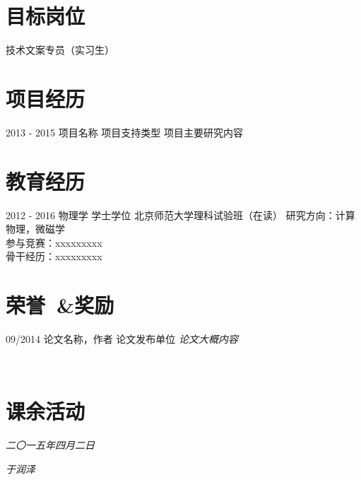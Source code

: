 \documentclass[]{friggeri-cv}
\begin{document}
\section{\cuti 目标岗位}
技术文案专员（实习生）
\section{\cuti 项目经历}
\begin{entrylist}
  \entry
    {2013 - 2015}
    {\cuti 项目名称}
    {项目支持类型}
    {项目主要研究内容\\}
\end{entrylist}

\section{\cuti 教育经历}
\begin{entrylist}
  \entry
    {2012 - 2016}
    {\cuti 物理学 学士学位}
    {北京师范大学理科试验班（在读）}
    {研究方向：计算物理，微磁学\\
    参与竞赛：xxxxxxxxx\\
    骨干经历：xxxxxxxxx\\}
\end{entrylist}

\section{\cuti 荣誉~\&奖励}
\begin{entrylist}
  \entry
    {09/2014}
    {\cuti 论文名称，作者}
    {论文发布单位}
    {\emph{论文大概内容}}
\end{entrylist}\\

\section{\cuti 课余活动}
\begin{entrylist}
\end{entrylist}

\vspace{40pt}

\begin{flushright}
\emph{二〇一五年四月二日}
\end{flushright}
\begin{flushright}
\emph{于润泽}
\end{flushright}
\end{document}
